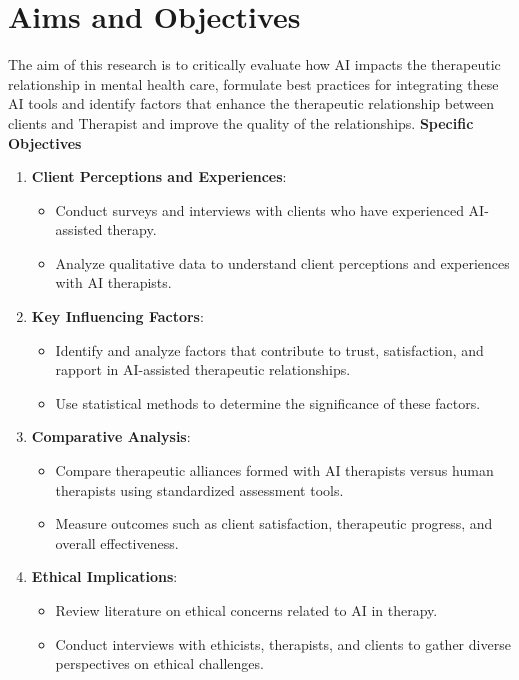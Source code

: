 \documentclass[12pt]{article}
\begin{document}
    \section {Aims and Objectives}
    The aim of this research is to critically evaluate how AI impacts the therapeutic relationship in mental health care, formulate  best practices for integrating these AI tools and identify factors that enhance the therapeutic relationship between clients and Therapist and improve the quality of the relationships.
    \newline
    \textbf{Specific Objectives}
    \begin{enumerate}
        \item \textbf{Client Perceptions and Experiences}:
        \begin{itemize}
            \item Conduct surveys and interviews with clients who have experienced AI-assisted therapy.
            \item Analyze qualitative data to understand client perceptions and experiences with AI therapists.
        \end{itemize}
        \item \textbf{Key Influencing Factors}:
        \begin{itemize}
            \item Identify and analyze factors that contribute to trust, satisfaction, and rapport in AI-assisted therapeutic relationships.
            \item Use statistical methods to determine the significance of these factors.
        \end{itemize}
        \item \textbf{Comparative Analysis}:
        \begin{itemize}
            \item Compare therapeutic alliances formed with AI therapists versus human therapists using standardized assessment tools.
            \item Measure outcomes such as client satisfaction, therapeutic progress, and overall effectiveness.
        \end{itemize}

        \item \textbf{Ethical Implications}:
        \begin{itemize}
            \item Review literature on ethical concerns related to AI in therapy.
            \item Conduct interviews with ethicists, therapists, and clients to gather diverse perspectives on ethical challenges.
        \end{itemize}


\end{enumerate}
\end{document}
